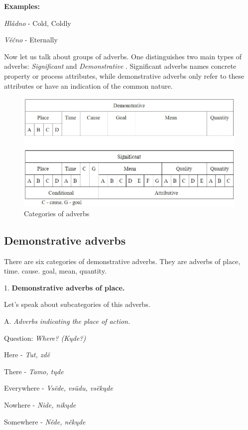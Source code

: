 \textbf{Examples:}

\textit{Hlådno} - Cold, Coldly

\textit{Věčno} - Eternally

Now let us talk about groups of adverbs. One distinguishes two main types of adverbs: \textit{Significant} and \textit{Demonstrative} \cite{belorussian}. Significant adverbs names concrete property or process attributes, while demonstrative adverbs only refer to these attributes or have an indication of the common nature.

\begin{figure}
	\includegraphics[width=\linewidth]{./sources/adverbs.jpg}
	\caption{Categories of adverbs}
	\label{fig:adverbs}
\end{figure}

\subsection{Demonstrative adverbs}

There are six categories of demonstrative adverbs. They are adverbs of place, time. cause. goal, mean, quantity.

1. \textbf{Demonstrative adverbs of place.}

Let’s speak about subcategories of this adverbs. 

A. \textit{Adverbs indicating the place of action.}

Question: \textit{Where? (Kųde?)}

Here - \textit{Tut, zdě}

There - \textit{Tamo, tųde}

Everywhere - \textit{Vsëde, vsüdu, vsëkųde}

Nowhere - \textit{Nide, nikųde}

Somewhere - \textit{Něde, někųde}

